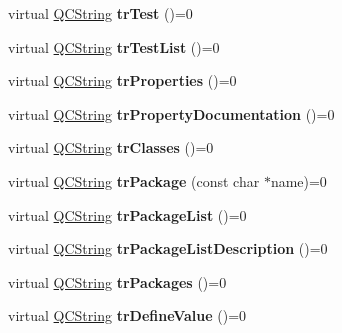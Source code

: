 \begin{DoxyCompactItemize}
virtual \mbox{\hyperlink{class_q_c_string}{Q\+C\+String}} {\bfseries tr\+Test} ()=0
\item 
\mbox{\label{class_translator_ad29041fc573a780089d35d5b61533567}} 
virtual \mbox{\hyperlink{class_q_c_string}{Q\+C\+String}} {\bfseries tr\+Test\+List} ()=0
\item 
\mbox{\label{class_translator_af77d1512b4b3c84c0e37492d0c9fa249}} 
virtual \mbox{\hyperlink{class_q_c_string}{Q\+C\+String}} {\bfseries tr\+Properties} ()=0
\item 
\mbox{\label{class_translator_a238509e37848af806a976776bc8af8cb}} 
virtual \mbox{\hyperlink{class_q_c_string}{Q\+C\+String}} {\bfseries tr\+Property\+Documentation} ()=0
\item 
\mbox{\label{class_translator_a182de1d9ac67d054637647d67d90f788}} 
virtual \mbox{\hyperlink{class_q_c_string}{Q\+C\+String}} {\bfseries tr\+Classes} ()=0
\item 
\mbox{\label{class_translator_abed3ef8029bcccbd9eebdb4f2d04782d}} 
virtual \mbox{\hyperlink{class_q_c_string}{Q\+C\+String}} {\bfseries tr\+Package} (const char $\ast$name)=0
\item 
\mbox{\label{class_translator_afaaad2ae5bf1e542b484d7cd58ed9141}} 
virtual \mbox{\hyperlink{class_q_c_string}{Q\+C\+String}} {\bfseries tr\+Package\+List} ()=0
\item 
\mbox{\label{class_translator_a0d426f7f05e8f1ce512709d7dc24a302}} 
virtual \mbox{\hyperlink{class_q_c_string}{Q\+C\+String}} {\bfseries tr\+Package\+List\+Description} ()=0
\item 
\mbox{\label{class_translator_a5d327e7906daeed24aa27d26f2a7c98a}} 
virtual \mbox{\hyperlink{class_q_c_string}{Q\+C\+String}} {\bfseries tr\+Packages} ()=0
\item 
\mbox{\label{class_translator_a33b3a92d21ec58a5cba1043aefbd466b}} 
virtual \mbox{\hyperlink{class_q_c_string}{Q\+C\+String}} {\bfseries tr\+Define\+Value} ()=0
\item 
\mbox{\label{class_translator_a09bd1ed5d149f8b2c37f660d7d84cfde}} 

\end{DoxyCompactItemize}
